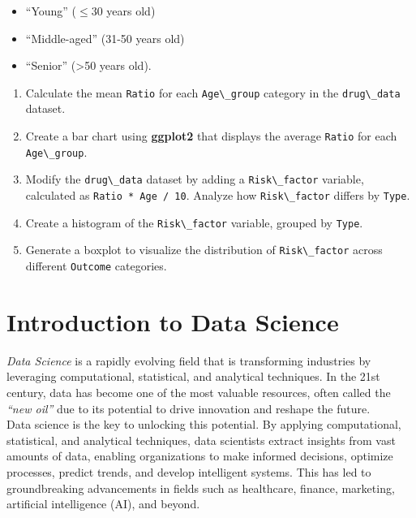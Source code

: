 \documentclass[
  11pt,
]{book}
\newcommand{\passthrough}[1]{#1}
\providecommand{\tightlist}{%
  \setlength{\itemsep}{0pt}\setlength{\parskip}{0pt}}
\theoremstyle{definition}
\theoremstyle{definition}
\theoremstyle{definition}
\theoremstyle{definition}
\theoremstyle{remark}
\begin{document}
\begin{itemize}
\tightlist
\item
  ``Young'' (\(\leq 30\) years old)
\item
  ``Middle-aged'' (31-50 years old)
\item
  ``Senior'' (\textgreater50 years old).
\end{itemize}

\begin{enumerate}
\def\labelenumi{\arabic{enumi}.}
\setcounter{enumi}{20}
\tightlist
\item
  Calculate the mean \passthrough{\lstinline!Ratio!} for each \passthrough{\lstinline!Age\_group!} category in the \passthrough{\lstinline!drug\_data!} dataset.\\
\item
  Create a bar chart using \textbf{ggplot2} that displays the average \passthrough{\lstinline!Ratio!} for each \passthrough{\lstinline!Age\_group!}.\\
\item
  Modify the \passthrough{\lstinline!drug\_data!} dataset by adding a \passthrough{\lstinline!Risk\_factor!} variable, calculated as \passthrough{\lstinline!Ratio * Age / 10!}. Analyze how \passthrough{\lstinline!Risk\_factor!} differs by \passthrough{\lstinline!Type!}.\\
\item
  Create a histogram of the \passthrough{\lstinline!Risk\_factor!} variable, grouped by \passthrough{\lstinline!Type!}.\\
\item
  Generate a boxplot to visualize the distribution of \passthrough{\lstinline!Risk\_factor!} across different \passthrough{\lstinline!Outcome!} categories.
\end{enumerate}

\chapter{Introduction to Data Science}\label{chapter-intro-DS}

\emph{Data Science} is a rapidly evolving field that is transforming industries by leveraging computational, statistical, and analytical techniques. In the 21st century, data has become one of the most valuable resources, often called the \emph{``new oil''} due to its potential to drive innovation and reshape the future.\\
Data science is the key to unlocking this potential. By applying computational, statistical, and analytical techniques, data scientists extract insights from vast amounts of data, enabling organizations to make informed decisions, optimize processes, predict trends, and develop intelligent systems. This has led to groundbreaking advancements in fields such as healthcare, finance, marketing, artificial intelligence (AI), and beyond.
\end{document}
